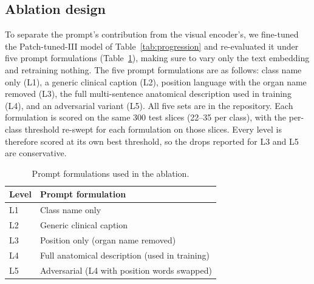 \documentclass[10pt]{article}
\begin{document}
\subsection{Ablation design}
\label{sec:methods:captions}

To separate the prompt's contribution from the visual encoder's, we fine-tuned the Patch-tuned-III model of Table~\ref{tab:progression} and re-evaluated it under five prompt formulations (Table~\ref{tab:captiondefs}), making sure to vary only the text embedding and retraining nothing. The five prompt formulations are as follows: class name only (L1), a generic clinical caption (L2), position language with the organ name
removed (L3), the full multi-sentence anatomical description used in training (L4), and an adversarial variant (L5). All five sets are in the repository.
Each formulation is scored on the same 300 test slices (22--35 per class), with
the per-class threshold re-swept for each formulation on those slices. Every level
is therefore scored at its own best threshold, so the drops reported for L3 and L5 are conservative.

\begin{table}[H]
\centering
\caption{Prompt formulations used in the ablation.}
\label{tab:captiondefs}
\begin{tabular}{ll}
\toprule
Level & Prompt formulation \\
\midrule
L1 & Class name only \\
L2 & Generic clinical caption \\
L3 & Position only (organ name removed) \\
L4 & Full anatomical description (used in training) \\
L5 & Adversarial (L4 with position words swapped) \\
\bottomrule
\end{tabular}
\end{table}
\end{document}
